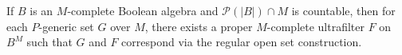 If $B$ is an $M$-complete Boolean algebra and $\mathcal{P}(|B|) \cap M$ is countable, then for each $P$-generic set $G$ over $M$, there exists a proper $M$-complete ultrafilter $F$ on $B^M$ such that $G$ and $F$ correspond via the regular open set construction.
